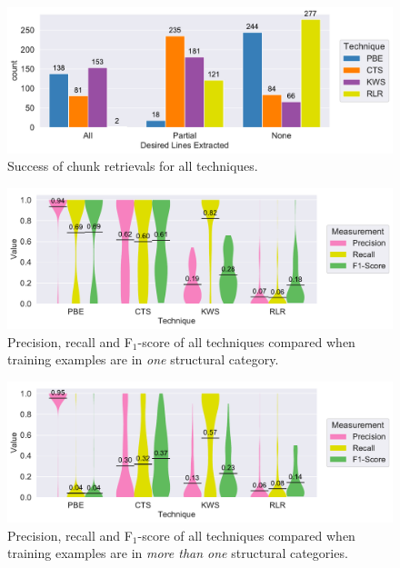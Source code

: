 \begin{figure}[!t]
		\centering
		\includegraphics[width=\columnwidth, clip]{img/big-study/success-partial-all.pdf}
		\caption{Success of chunk retrievals for all techniques.}
		\label{fig:success-partial-all}
\end{figure}


\begin{figure}[!t]
	\centering
		\includegraphics[width=\columnwidth, clip]{img/big-study/recall-precision-singlecategory-all.pdf}
		\caption{Precision, recall and F$_{1}$-score of all techniques compared when training examples are in \emph{one} structural category.}
		\label{fig:recall-precision-singlecategory-all}
\end{figure}

\begin{figure}[!t]
		\centering
		\includegraphics[width=\columnwidth, clip]{img/big-study/recall-precision-multicategory-all.pdf}
		\caption{Precision, recall and F$_{1}$-score of all techniques compared when training examples are in \emph{more than one} structural categories.}
		\label{fig:recall-precision-multicategory-all}
\end{figure}


